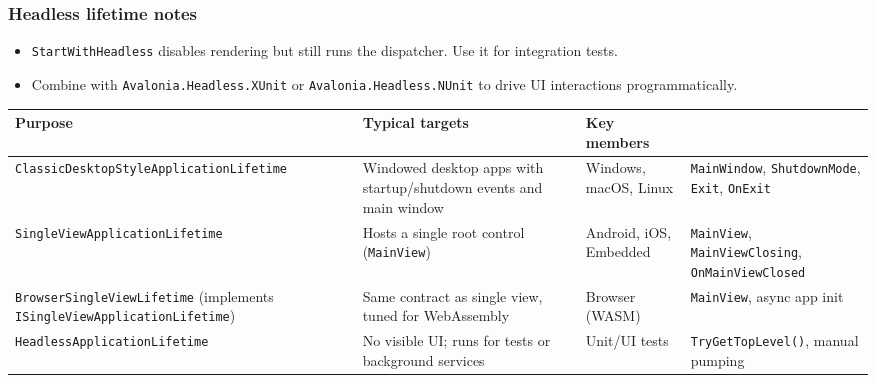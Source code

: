 \subsubsection{Headless lifetime notes}\label{headless-lifetime-notes}

\begin{itemize}
\tightlist
\item
  \passthrough{\lstinline!StartWithHeadless!} disables rendering but
  still runs the dispatcher. Use it for integration tests.
\item
  Combine with \passthrough{\lstinline!Avalonia.Headless.XUnit!} or
  \passthrough{\lstinline!Avalonia.Headless.NUnit!} to drive UI
  interactions programmatically.
\end{itemize}

\begin{longtable}[]{@{}
  >{\raggedright\arraybackslash}p{}
  >{\raggedright\arraybackslash}p{}
  >{\raggedright\arraybackslash}p{}
  >{\raggedright\arraybackslash}p{}@{}}
\toprule\noalign{}
\begin{minipage}[b]{\linewidth}\raggedright
Purpose
\end{minipage} & \begin{minipage}[b]{\linewidth}\raggedright
Typical targets
\end{minipage} & \begin{minipage}[b]{\linewidth}\raggedright
Key members
\end{minipage} & \begin{minipage}[b]{\linewidth}\raggedright
\end{minipage} \\
\midrule\noalign{}
\endhead
\bottomrule\noalign{}
\endlastfoot
\passthrough{\lstinline!ClassicDesktopStyleApplicationLifetime!} &
Windowed desktop apps with startup/shutdown events and main window &
Windows, macOS, Linux & \passthrough{\lstinline!MainWindow!},
\passthrough{\lstinline!ShutdownMode!}, \passthrough{\lstinline!Exit!},
\passthrough{\lstinline!OnExit!} \\
\passthrough{\lstinline!SingleViewApplicationLifetime!} & Hosts a single
root control (\passthrough{\lstinline!MainView!}) & Android, iOS,
Embedded & \passthrough{\lstinline!MainView!},
\passthrough{\lstinline!MainViewClosing!},
\passthrough{\lstinline!OnMainViewClosed!} \\
\passthrough{\lstinline!BrowserSingleViewLifetime!} (implements
\passthrough{\lstinline!ISingleViewApplicationLifetime!}) & Same
contract as single view, tuned for WebAssembly & Browser (WASM) &
\passthrough{\lstinline!MainView!}, async app init \\
\passthrough{\lstinline!HeadlessApplicationLifetime!} & No visible UI;
runs for tests or background services & Unit/UI tests &
\passthrough{\lstinline!TryGetTopLevel()!}, manual pumping \\
\end{longtable}

